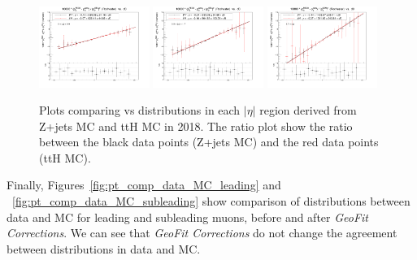 \begin{figure}[h!]
    \centering
    \includegraphics[width=0.32\textwidth]{images_geofit/ttH_eta_0_0p9_2018.png}
    \includegraphics[width=0.32\textwidth]{images_geofit/ttH_eta_0p9_1p7_2018.png}
    \includegraphics[width=0.32\textwidth]{images_geofit/ttH_eta_1p7_inf_2018.png}
    \caption{Plots comparing \dptoverptsquare vs \dzeroBS distributions in each $|\eta|$ region derived from Z+jets MC and ttH MC in 2018. The ratio plot show the ratio between the black data points (Z+jets MC) and the red data points (ttH MC).}
    \label{fig:ttH_d0_2018}
\end{figure}

Finally, Figures~\ref{fig:pt_comp_data_MC_leading} and ~\ref{fig:pt_comp_data_MC_subleading} show comparison of \pt distributions between data and MC for leading and subleading muons, before and after \textit{GeoFit Corrections}. We can see that \textit{GeoFit Corrections} do not change the agreement between \pt distributions in data and MC.

